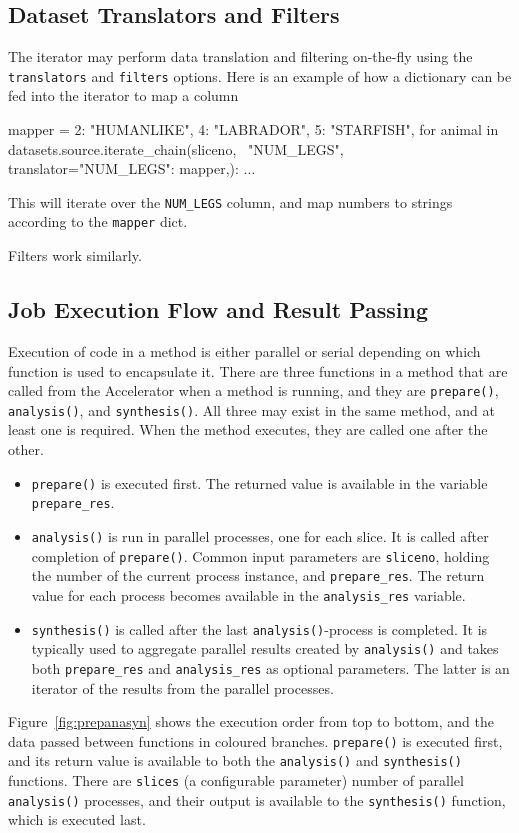 \subsection{Dataset Translators and Filters}

The iterator may perform data translation and filtering on-the-fly
using the \texttt{translators} and \texttt{filters} options.  Here is
an example of how a dictionary can be fed into the iterator to map a
column
\begin{python}
mapper = {2: "HUMANLIKE", 4: "LABRADOR", 5: "STARFISH",}
for animal in datasets.source.iterate_chain(sliceno, \
  "NUM_LEGS", translator={"NUM_LEGS": mapper,}):
    ...
\end{python}
This will iterate over the \texttt{NUM\_LEGS} column, and map numbers
to strings according to the \texttt{mapper} dict.

Filters work similarly.



\subsection{Job Execution Flow and Result Passing}

Execution of code in a method is either parallel or serial depending
on which function is used to encapsulate it.  There are three
functions in a method that are called from the Accelerator when a
method is running, and they are \texttt{prepare()},
\texttt{analysis()}, and \texttt{synthesis()}.  All three may exist in
the same method, and at least one is required.  When the method
executes, they are called one after the other.
\begin{itemize}
\item[] \texttt{prepare()} is executed first.  The returned value is
  available in the variable \texttt{prepare\_res}.
\item[] \texttt{analysis()} is run in parallel processes, one for each
  slice.  It is called after completion of \texttt{prepare()}.  Common
  input parameters are \texttt{sliceno}, holding the number of the
  current process instance, and \texttt{prepare\_res}.  The return
  value for each process becomes available in the
  \texttt{analysis\_res} variable.
\item[] \texttt{synthesis()} is called after the last
  \texttt{analysis()}-process is completed.  It is typically used to
  aggregate parallel results created by \texttt{analysis()} and takes
  both \texttt{prepare\_res} and \texttt{analysis\_res} as optional
  parameters.  The latter is an iterator of the results from the
  parallel processes.
\end{itemize}
Figure~\ref{fig:prepanasyn} shows the execution order from top to
bottom, and the data passed between functions in coloured branches.
\texttt{prepare()} is executed first, and its return value is
available to both the \texttt{analysis()} and \texttt{synthesis()}
functions.  There are \texttt{slices} (a configurable parameter)
number of parallel \texttt{analysis()} processes, and their output is
available to the \texttt{synthesis()} function, which is executed
last.

